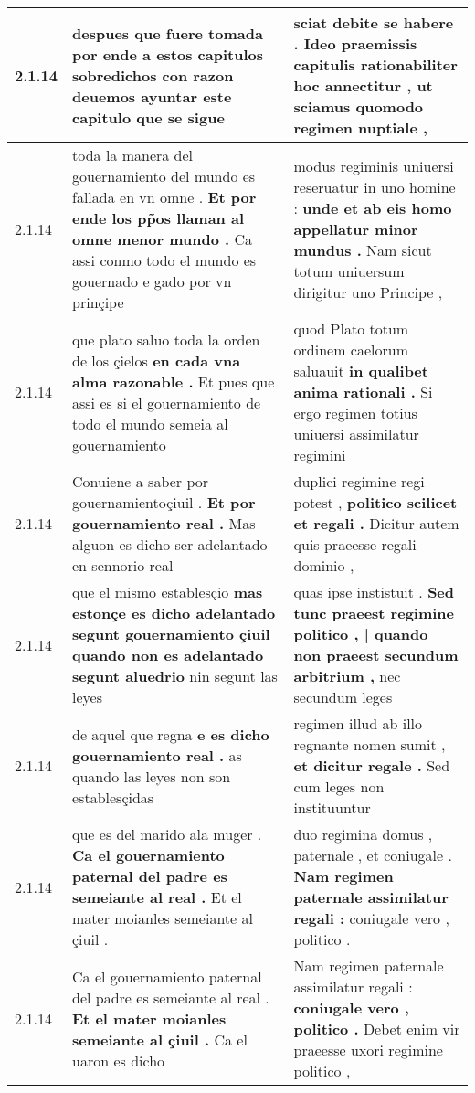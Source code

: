 \begin{tabular}{|p{1cm}|p{6.5cm}|p{6.5cm}|}
2.1.14 & despues que fuere tomada \textbf{ por ende a estos capitulos sobredichos con razon deuemos ayuntar este capitulo } que se sigue & sciat debite se habere . \textbf{ Ideo praemissis capitulis rationabiliter hoc annectitur , } ut sciamus quomodo regimen nuptiale , \\\hline
2.1.14 & toda la manera del gouernamiento del mundo es fallada en vn omne . \textbf{ Et por ende los pp̃os llaman al omne menor mundo . } Ca assi conmo todo el mundo es gouernado e gado por vn prinçipe & modus regiminis uniuersi reseruatur in uno homine : \textbf{ unde et ab eis homo appellatur minor mundus . } Nam sicut totum uniuersum dirigitur uno Principe , \\\hline
2.1.14 & que plato saluo toda la orden de los çielos \textbf{ en cada vna alma razonable . } Et pues que assi es si el gouernamiento de todo el mundo semeia al gouernamiento & quod Plato totum ordinem caelorum saluauit \textbf{ in qualibet anima rationali . } Si ergo regimen totius uniuersi assimilatur regimini \\\hline
2.1.14 & Conuiene a saber por gouernamientoçiuil . \textbf{ Et por gouernamiento real . } Mas alguon es dicho ser adelantado en sennorio real & duplici regimine regi potest , \textbf{ politico scilicet et regali . } Dicitur autem quis praeesse regali dominio , \\\hline
2.1.14 & que el mismo establesçio \textbf{ mas estonçe es dicho adelantado segunt gouernamiento çiuil quando non es adelantado segunt aluedrio } nin segunt las leyes & quas ipse instistuit . \textbf{ Sed tunc praeest regimine politico , | quando non praeest secundum arbitrium , } nec secundum leges \\\hline
2.1.14 & de aquel que regna \textbf{ e es dicho gouernamiento real . } as quando las leyes non son establesçidas & regimen illud ab illo regnante nomen sumit , \textbf{ et dicitur regale . } Sed cum leges non instituuntur \\\hline
2.1.14 & que es del marido ala muger . \textbf{ Ca el gouernamiento paternal del padre es semeiante al real . } Et el mater moianles semeiante al çiuil . & duo regimina domus , paternale , et coniugale . \textbf{ Nam regimen paternale assimilatur regali : } coniugale vero , politico . \\\hline
2.1.14 & Ca el gouernamiento paternal del padre es semeiante al real . \textbf{ Et el mater moianles semeiante al çiuil . } Ca el uaron es dicho & Nam regimen paternale assimilatur regali : \textbf{ coniugale vero , politico . } Debet enim vir praeesse uxori regimine politico , \\\hline

\end{tabular}
